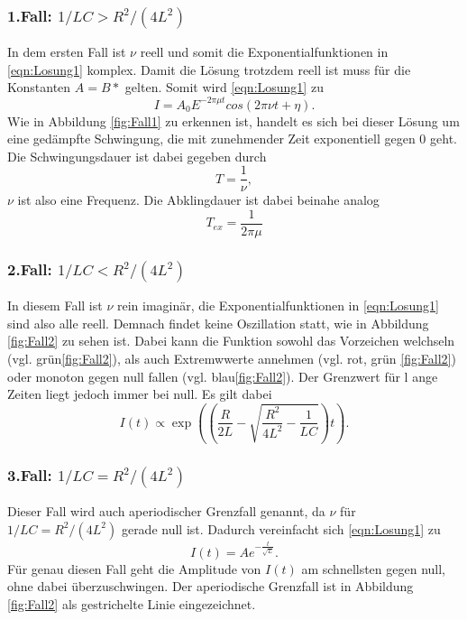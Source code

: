 \subsubsection*{1.Fall: $1/LC>R^2/(4L^2)$}
In dem ersten Fall ist $\nu$ reell und somit die Exponentialfunktionen in \eqref{eqn:Losung1} komplex. Damit die Lösung trotzdem reell ist muss
für die Konstanten $A=B*$ gelten. Somit wird \eqref{eqn:Losung1} zu
\begin{equation}
    I=A_0E^{-2\pi\mu t} cos(2\pi\nu t+\eta).
    \label{eqn:Fall1}
\end{equation}
Wie in Abbildung \ref{fig:Fall1} zu erkennen ist, handelt es sich bei dieser Lösung um eine gedämpfte Schwingung, die mit zunehmender Zeit 
exponentiell gegen 0 geht. Die Schwingungsdauer ist dabei gegeben durch
\begin{equation*}
    T=\frac{1}{\nu} ,
\end{equation*}
$\nu$ ist also eine Frequenz. Die Abklingdauer ist dabei beinahe analog
\begin{equation}
    T_{ex}=\frac{1}{2\pi\mu}
    \label{eqn:Tex}
\end{equation}

\subsubsection*{2.Fall: $1/LC<R^2/(4L^2)$}
In diesem Fall ist $\nu$ rein imaginär, die Exponentialfunktionen in \eqref{eqn:Losung1} sind also alle reell. Demnach findet keine Oszillation
statt, wie in Abbildung \ref{fig:Fall2} zu sehen ist. Dabei kann die Funktion sowohl das Vorzeichen welchseln (vgl. grün\ref{fig:Fall2}), als
auch Extremwwerte annehmen (vgl. rot, grün \ref{fig:Fall2}) oder monoton gegen null fallen (vgl. blau\ref{fig:Fall2}). Der Grenzwert für l
ange Zeiten liegt jedoch immer bei null. Es gilt dabei
\begin{equation*}
    I(t)\propto \exp\left(\left(\frac{R}{2L}-\sqrt{\frac{R^2}{4L^2}-\frac{1}{LC}}\right)t\right)    .
\end{equation*}

\subsubsection*{3.Fall: $1/LC=R^2/(4L^2)$}
Dieser Fall wird auch aperiodischer Grenzfall genannt, da $\nu$ für $1/LC=R^2/(4L^2)$ gerade null ist. Dadurch vereinfacht sich \eqref{eqn:Losung1}
zu 
\begin{equation*}
    I(t)=Ae^{-\frac{t}{\sqrt{L}}}   .
\end{equation*}
Für genau diesen Fall geht die Amplitude von $I(t)$ am schnellsten gegen null, ohne dabei überzuschwingen. Der aperiodische Grenzfall ist in 
Abbildung \ref{fig:Fall2} als gestrichelte Linie eingezeichnet. 

